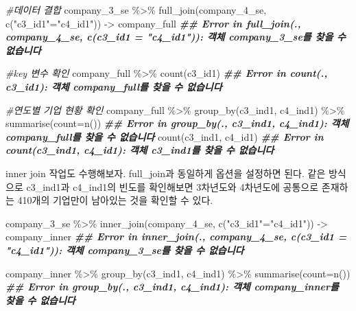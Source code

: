 \documentclass[
]{book}
\newenvironment{Shaded}{\begin{snugshade}}{\end{snugshade}}
\newcommand{\AttributeTok}[1]{\textcolor[rgb]{0.77,0.63,0.00}{#1}}
\newcommand{\CommentTok}[1]{\textcolor[rgb]{0.56,0.35,0.01}{\textit{#1}}}
\newcommand{\DocumentationTok}[1]{\textcolor[rgb]{0.56,0.35,0.01}{\textbf{\textit{#1}}}}
\newcommand{\FunctionTok}[1]{\textcolor[rgb]{0.00,0.00,0.00}{#1}}
\newcommand{\NormalTok}[1]{#1}
\newcommand{\OtherTok}[1]{\textcolor[rgb]{0.56,0.35,0.01}{#1}}
\newcommand{\SpecialCharTok}[1]{\textcolor[rgb]{0.00,0.00,0.00}{#1}}
\newcommand{\StringTok}[1]{\textcolor[rgb]{0.31,0.60,0.02}{#1}}
\theoremstyle{definition}
\theoremstyle{definition}
\theoremstyle{definition}
\theoremstyle{definition}
\theoremstyle{remark}
\begin{document}
\begin{Shaded}
\begin{Highlighting}[]
\CommentTok{\#데이터 결합}
\NormalTok{company\_3\_se }\SpecialCharTok{\%\textgreater{}\%} 
  \FunctionTok{full\_join}\NormalTok{(company\_4\_se, }\FunctionTok{c}\NormalTok{(}\StringTok{"c3\_id1"}\OtherTok{=}\StringTok{"c4\_id1"}\NormalTok{)) }\OtherTok{{-}\textgreater{}}\NormalTok{ company\_full}
\DocumentationTok{\#\# Error in full\_join(., company\_4\_se, c(c3\_id1 = "c4\_id1")): 객체 \textquotesingle{}company\_3\_se\textquotesingle{}를 찾을 수 없습니다}

\CommentTok{\#key 변수 확인}
\NormalTok{company\_full }\SpecialCharTok{\%\textgreater{}\%} 
  \FunctionTok{count}\NormalTok{(c3\_id1)}
\DocumentationTok{\#\# Error in count(., c3\_id1): 객체 \textquotesingle{}company\_full\textquotesingle{}를 찾을 수 없습니다}

\CommentTok{\#연도별 기업 현황 확인}
\NormalTok{company\_full }\SpecialCharTok{\%\textgreater{}\%} 
  \FunctionTok{group\_by}\NormalTok{(c3\_ind1, c4\_ind1) }\SpecialCharTok{\%\textgreater{}\%} 
  \FunctionTok{summarise}\NormalTok{(}\AttributeTok{count=}\FunctionTok{n}\NormalTok{())}
\DocumentationTok{\#\# Error in group\_by(., c3\_ind1, c4\_ind1): 객체 \textquotesingle{}company\_full\textquotesingle{}를 찾을 수 없습니다}
  \FunctionTok{count}\NormalTok{(c3\_ind1, c4\_id1)}
\DocumentationTok{\#\# Error in count(c3\_ind1, c4\_id1): 객체 \textquotesingle{}c3\_ind1\textquotesingle{}를 찾을 수 없습니다}
\end{Highlighting}
\end{Shaded}

inner join 작업도 수행해보자. full\_join과 동일하게 옵션을 설정하면 된다. 같은 방식으로 c3\_ind1과 c4\_ind1의 빈도를 확인해보면 3차년도와 4차년도에 공통으로 존재하는 410개의 기업만이 남아있는 것을 확인할 수 있다.

\begin{Shaded}
\begin{Highlighting}[]
\NormalTok{company\_3\_se }\SpecialCharTok{\%\textgreater{}\%} 
  \FunctionTok{inner\_join}\NormalTok{(company\_4\_se, }\FunctionTok{c}\NormalTok{(}\StringTok{"c3\_id1"}\OtherTok{=}\StringTok{"c4\_id1"}\NormalTok{)) }\OtherTok{{-}\textgreater{}}\NormalTok{ company\_inner}
\DocumentationTok{\#\# Error in inner\_join(., company\_4\_se, c(c3\_id1 = "c4\_id1")): 객체 \textquotesingle{}company\_3\_se\textquotesingle{}를 찾을 수 없습니다}

\NormalTok{company\_inner }\SpecialCharTok{\%\textgreater{}\%} 
  \FunctionTok{group\_by}\NormalTok{(c3\_ind1, c4\_ind1) }\SpecialCharTok{\%\textgreater{}\%} 
  \FunctionTok{summarise}\NormalTok{(}\AttributeTok{count=}\FunctionTok{n}\NormalTok{())}
\DocumentationTok{\#\# Error in group\_by(., c3\_ind1, c4\_ind1): 객체 \textquotesingle{}company\_inner\textquotesingle{}를 찾을 수 없습니다}
\end{Highlighting}
\end{Shaded}
\end{document}
